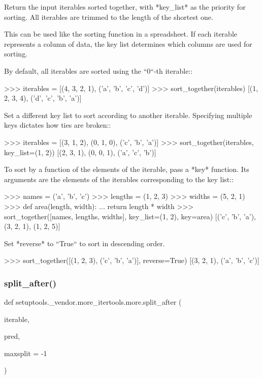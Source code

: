 \begin{DoxyVerb}Return the input iterables sorted together, with *key_list* as the
priority for sorting. All iterables are trimmed to the length of the
shortest one.

This can be used like the sorting function in a spreadsheet. If each
iterable represents a column of data, the key list determines which
columns are used for sorting.

By default, all iterables are sorted using the ``0``-th iterable::

    >>> iterables = [(4, 3, 2, 1), ('a', 'b', 'c', 'd')]
    >>> sort_together(iterables)
    [(1, 2, 3, 4), ('d', 'c', 'b', 'a')]

Set a different key list to sort according to another iterable.
Specifying multiple keys dictates how ties are broken::

    >>> iterables = [(3, 1, 2), (0, 1, 0), ('c', 'b', 'a')]
    >>> sort_together(iterables, key_list=(1, 2))
    [(2, 3, 1), (0, 0, 1), ('a', 'c', 'b')]

To sort by a function of the elements of the iterable, pass a *key*
function. Its arguments are the elements of the iterables corresponding to
the key list::

    >>> names = ('a', 'b', 'c')
    >>> lengths = (1, 2, 3)
    >>> widths = (5, 2, 1)
    >>> def area(length, width):
    ...     return length * width
    >>> sort_together([names, lengths, widths], key_list=(1, 2), key=area)
    [('c', 'b', 'a'), (3, 2, 1), (1, 2, 5)]

Set *reverse* to ``True`` to sort in descending order.

    >>> sort_together([(1, 2, 3), ('c', 'b', 'a')], reverse=True)
    [(3, 2, 1), ('a', 'b', 'c')]\end{DoxyVerb}
 \mbox{\label{namespacesetuptools_1_1__vendor_1_1more__itertools_1_1more_ab63f1dd5ede0301ffade1f2b8f808845}} 
\subsubsection{\texorpdfstring{split\+\_\+after()}{split\_after()}}
{\footnotesize\ttfamily def setuptools.\+\_\+vendor.\+more\+\_\+itertools.\+more.\+split\+\_\+after (\begin{DoxyParamCaption}\item[{}]{iterable,  }\item[{}]{pred,  }\item[{}]{maxsplit = {\ttfamily -\/1} }\end{DoxyParamCaption})}


